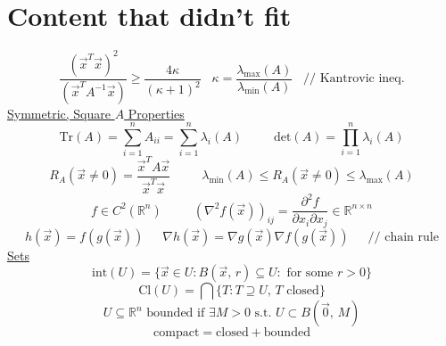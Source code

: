 \documentclass[twocolumn,12pt]{article}    %
\begin{document}
\newpage
\section*{Content that didn't fit}
\begin{equation*}
    \frac{(\vec{x}^T \vec{x})^2}{(\vec{x}^T A^{-1} \vec{x})} \geq \frac{4\kappa}{(\kappa+1)^2} \hspace{10pt}
    \kappa = \frac{\lambda_{\max}(A)}{\lambda_{\min}(A)} \hspace{10pt} \text{// Kantrovic ineq.}  
\end{equation*}
\noindent \underline{Symmetric, Square \(A\) Properties}
\begin{equation*}
     \text{Tr}(A) = \sum_{i=1}^n A_{ii} = \sum_{i=1}^n \lambda_i(A) \hspace{30pt} \text{det}(A) = \prod_{i=1}^n \lambda_i(A) 
\end{equation*}
\begin{equation*}
      R_{A}(\vec{x}\neq 0 ) =\frac{\vec{x}^TA\vec{x}}{\vec{x}^T\vec{x}}\hspace{30pt} \lambda_{\min}(A) \leq R_{A}(\vec{x}\neq0)\leq \lambda_{\max}(A) 
\end{equation*}
\begin{equation*}
    f\in C^2(\mathds{R}^n) \hspace{30pt} \left(\nabla^2 f(\vec{x}) \right)_{ij} =  \frac{\partial^2f}{\partial x_i \partial x_j} \in \mathds{R}^{n \times n}
\end{equation*}
\begin{equation*}
    h(\vec{x}) = f(g(\vec{x})) \hspace{18pt} \nabla h(\vec{x}) = \nabla g(\vec{x}) \nabla f(g(\vec{x})) \hspace{18pt} \text{// chain rule}
\end{equation*}
\noindent \underline{Sets} 
\begin{equation*}
    \text{int}(U) = \{\vec{x} \in U : B(\vec{x},\,r) \subseteq U : \text{ for some } r >0 \}
\end{equation*} 
\begin{equation*}
    \text{Cl}(U) = \bigcap \{T: T \supseteq U,\, T \text{ closed}\}
\end{equation*}
\begin{equation*}
    U\subseteq\mathds{R}^n \text{ bounded if } \exists M>0 \text{  s.t.  } U \subset B(\vec{0},\, M)
\end{equation*}
\begin{equation*}
    \text{compact} = \text{closed} + \text{bounded}
\end{equation*}
\end{document}
